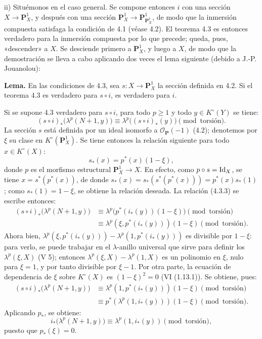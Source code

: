 ii) Situémonos en el caso general. Se compone entonces \(i\) con una sección \(X\to\mathbf P_X^1\), y después con una sección \(\mathbf P_X^1\to\mathbf P_{\mathbf P_X^1}^1\), de modo que la inmersión compuesta satisfaga la condición de 4.1 (véase 4.2). El teorema 4.3 es entonces verdadero para la inmersión compuesta por lo que precede; queda, pues, «descender» a \(X\). Se desciende primero a \(\mathbf P_X^1\), y luego a \(X\), de modo que la demostración se lleva a cabo aplicando dos veces el lema siguiente (debido a J.-P. Jouanolou):

\textbf{Lema.} En las condiciones de 4.3, sea \(s:X\to\mathbf P_X^1\) la sección definida en 4.2. Si el teorema 4.3 es verdadero para \(s\circ i\), es verdadero para \(i\).

Si se supone 4.3 verdadero para \(s\circ i\), para todo \(p\ge1\) y todo \(y\in K^\circ(Y)\) se tiene:
\begin{equation}\tag{4.3.3}
 (s\circ i)_*\bigl(\lambda^p(N+1,y)\bigr)
 \equiv
 \lambda^p\bigl((s\circ i)_*(y)\bigr)
 \pmod{\text{torsión}}.
\end{equation}
La sección \(s\) está definida por un ideal isomorfo a \(\mathcal O_{\mathbf P}(-1)\) (4.2); denotemos por \(\xi\) su clase en \(K^\circ(\mathbf P_X^1)\). Se tiene entonces la relación siguiente para todo \(x\in K^\circ(X)\):
\[
  s_*(x)=p^*(x)(1-\xi),
\]
donde \(p\) es el morfismo estructural \(\mathbf P_X^1\to X\). En efecto, como \(p\circ s=\operatorname{Id}_X\), se tiene \(x=s^*(p^*(x))\), de donde \(s_*(x)=s_*(s^*(p^*(x)))=p^*(x)s_*(1)\); como \(s_*(1)=1-\xi\), se obtiene la relación deseada. La relación (4.3.3) se escribe entonces:
\[
\begin{aligned}
(s\circ i)_*\bigl(\lambda^p(N+1,y)\bigr)
&\equiv \lambda^p\bigl(p^*(i_*(y))(1-\xi)\bigr)\pmod{\text{torsión}}\\
&\equiv \lambda^p(\xi,p^*(i_*(y)))(1-\xi)\pmod{\text{torsión}}.
\end{aligned}
\]
Ahora bien, \(\lambda^p(\xi,p^*(i_*(y)))-\lambda^p(1,p^*(i_*(y)))\) es divisible por \(1-\xi\): para verlo, se puede trabajar en el \(\lambda\)-anillo universal que sirve para definir los \(\lambda^p(\xi,X)\) (V 5); entonces \(\lambda^p(\xi,X)-\lambda^p(1,X)\) es un polinomio en \(\xi\), nulo para \(\xi=1\), y por tanto divisible por \(\xi-1\). Por otra parte, la ecuación de dependencia de \(\xi\) sobre \(K^\circ(X)\) es \((1-\xi)^2=0\) (VI (1.13.1)). Se obtiene, pues:
\[
\begin{aligned}
(s\circ i)_*\bigl(\lambda^p(N+1,y)\bigr)
&\equiv \lambda^p(1,p^*(i_*(y)))(1-\xi) \pmod{\text{torsión}}\\
&\equiv p^*(\lambda^p(1,i_*(y)))(1-\xi) \pmod{\text{torsión}}.
\end{aligned}
\]
Aplicando \(p_*\), se obtiene:
\begin{equation}\tag{4.3.4}
  i_*\bigl(\lambda^p(N+1,y)\bigr)
  \equiv \lambda^p(1,i_*(y)) \pmod{\text{torsión}},
\end{equation}
puesto que \(p_*(\xi)=0\).

